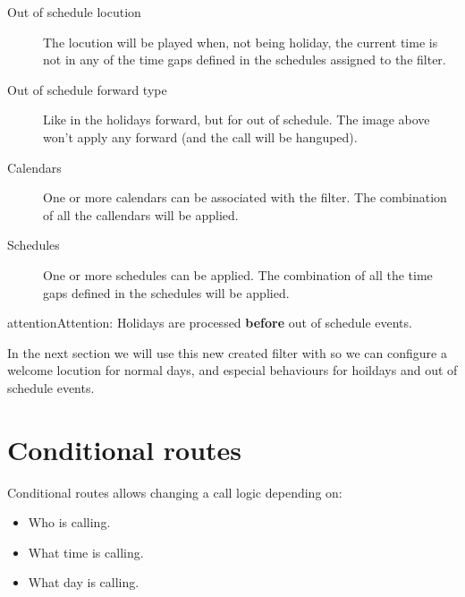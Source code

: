 \documentclass[letterpaper,10pt,english]{sphinxmanual}
\begin{document}
\begin{description}
\item[{Out of schedule locution}] \leavevmode{}\label{company/external_filters:term-out-of-schedule-locution}
The locution will be played when, not being holiday, the current time
is not in any of the time gaps defined in the schedules assigned to the
filter.

\item[{Out of schedule forward type}] \leavevmode{}\label{company/external_filters:term-out-of-schedule-forward-type}
Like in the holidays forward, but for out of schedule. The image above
won't apply any forward (and the call will be hanguped).

\item[{Calendars}] \leavevmode{}\label{company/external_filters:term-calendars}
One or more calendars can be associated with the filter. The combination
of all the callendars will be applied.

\item[{Schedules}] \leavevmode{}\label{company/external_filters:term-schedules}
One or more schedules can be applied. The combination of all the time
gaps defined in the schedules will be applied.

\end{description}

\begin{notice}{attention}{Attention:}
Holidays are processed \textbf{before} out of schedule events.
\end{notice}

In the next section we will use this new created filter with
{\hyperref[company/ddis:ddis]{}} so we can configure a welcome locution for normal days,
and especial behaviours for hoildays and out of schedule events.


\section{Conditional routes}
\label{company/conditional_routes::doc}\label{company/conditional_routes:conditional-routes}\label{company/conditional_routes:id1}
Conditional routes allows changing a call logic depending on:
\begin{itemize}
\item {} 
Who is calling.

\item {} 
What time is calling.

\item {} 
What day is calling.

\end{itemize}
\end{document}
